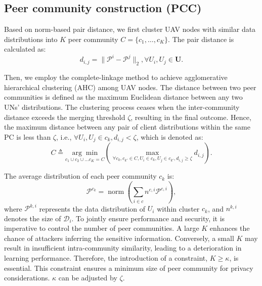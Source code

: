 \documentclass[lettersize,journal]{IEEEtran}
\begin{document}
\subsection{Peer community construction (PCC)}
Based on norm-based pair distance, we first cluster UAV nodes with similar data distributions into $K$ peer community $C=\{ c_{1}, \ldots, c_{K} \}$. The pair distance is calculated as:
\begin{equation}
d_{i,j}=\lVert \mathcal{P}^{i}-\mathcal{P}^{j} \rVert_{2}, \forall U_i,U_j\in \mathbf{U}.
\end{equation}

Then, we employ the complete-linkage method to achieve agglomerative hierarchical clustering (AHC) among UAV nodes. The distance between two peer communities is defined as the maximum Euclidean distance between any two UNs' distributions. The clustering process ceases when the inter-community distance exceeds the merging threshold $\zeta$, resulting in the final outcome. Hence, the maximum distance between any pair of client distributions within the same PC is less than $\zeta$, i.e., $\forall U_i, U_j \in c_k, d_{i,j} < \zeta$, which is denoted as:
\begin{equation}\label{eq:peer-construct}
 C\triangleq \underset{c_{1} \cup c_{2} \cup \ldots c_{K}=C}{\arg \min} \left(\max _{\forall c_{k},c_{k'} \in C ,U_i \in c_{k}, U_j \in c_{k'},d_{i, j}\geq\zeta} d_{i, j}\right) .
\end{equation}

The average distribution of each peer community $c_k$ is:
\begin{equation}
    	 \mathcal{P}^{c_k}=\operatorname{norm}\left(\sum_{i \in c} n^{c,i} \mathcal{P}^{c,i} \right),
\end{equation}
where $\mathcal{P}^{k,i}$ represents the data distribution of $U_i$ within cluster $c_k$, and $n^{k,i}$ denotes the size of $\mathcal{D}_i$. 
To jointly ensure performance and security, it is imperative to control the number of peer communities. A large $K$ enhances the chance of attackers inferring the sensitive information. Conversely, a small $K$ may result in insufficient intra-community similarity, leading to a deterioration in learning performance. Therefore, the introduction of a constraint, $K \geq \kappa$, is essential. This constraint ensures a minimum size of peer community for privacy considerations. $\kappa$ can be adjusted by $\zeta$.
\end{document}
